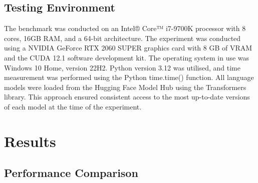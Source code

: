 \documentclass[12pt,a4paper]{article}
\begin{document}
	\subsection{Testing Environment}
	The benchmark was conducted on an Intel® Core™ i7-9700K processor with 8 cores, 16GB RAM, and a 64-bit architecture. The experiment was conducted using a NVIDIA GeForce RTX 2060 SUPER graphics card with 8 GB of VRAM and the CUDA 12.1 software development kit.  The operating system in use was Windows 10 Home, version 22H2. Python version 3.12 was utilised, and time measurement was performed using the Python time.time() function. All language models were loaded from the Hugging Face Model Hub using the Transformers library. This approach ensured consistent access to the most up-to-date versions of each model at the time of the experiment.
	

	
	\section{Results}
	\subsection{Performance Comparison}
	
	\newcommand{\scorecolor}[1]{%
		\ifnum#1=5\cellcolor{excellent}5\else
		\ifnum#1=4\cellcolor{good}4\else
		\ifnum#1=3\cellcolor{fair}3\else
		\ifnum#1=2\cellcolor{poor}2\else
		\cellcolor{bad}1\fi\fi\fi\fi
	}
	
\newcommand{\runtimecolor}[2]{%
	\ifdim#1pt<#2pt
	\cellcolor{excellent!50}#1
	\else
	\ifdim#1pt<2#2pt
	\cellcolor{good!50}#1
	\else
	\ifdim#1pt<3#2pt
	\cellcolor{fair!50}#1
	\else
	\ifdim#1pt<4#2pt
	\cellcolor{poor!50}#1
	\else
	\cellcolor{bad!50}#1
	\fi
	\fi
	\fi
	\fi
}
\end{document}
